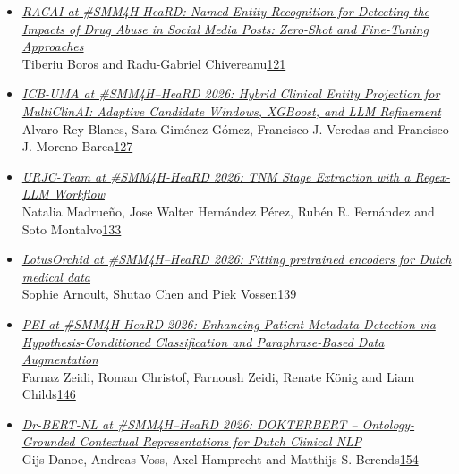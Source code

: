 \documentclass[11pt,oneside]{book}
\begin{document}
\begin{itemize}[leftmargin=*,label={}]
       \item \hyperlink{page.121}{\emph{RACAI at \#SMM4H-HeaRD: Named Entity Recognition for Detecting the Impacts of Drug Abuse in Social Media Posts: Zero-Shot and Fine-Tuning Approaches}}\\ \hspace*{2em} Tiberiu Boros and Radu-Gabriel Chivereanu\dotfill \hyperlink{page.121}{121}
       \item \hyperlink{page.127}{\emph{ICB-UMA at \#SMM4H–HeaRD 2026: Hybrid Clinical Entity Projection for MultiClinAI: Adaptive Candidate Windows, XGBoost, and LLM Refinement}}\\ \hspace*{2em} Alvaro Rey-Blanes, Sara Giménez-Gómez, Francisco J. Veredas and Francisco J. Moreno-Barea\dotfill \hyperlink{page.127}{127}
       \item \hyperlink{page.133}{\emph{URJC-Team at \#SMM4H-HeaRD 2026: TNM Stage Extraction with a Regex-LLM Workflow}}\\ \hspace*{2em} Natalia Madrueño, Jose Walter Hernández Pérez, Rubén R. Fernández and Soto Montalvo\dotfill \hyperlink{page.133}{133}
       \item \hyperlink{page.139}{\emph{LotusOrchid at \#SMM4H–HeaRD 2026: Fitting pretrained encoders for Dutch medical data}}\\ \hspace*{2em} Sophie Arnoult, Shutao Chen and Piek Vossen\dotfill \hyperlink{page.139}{139}
       \item \hyperlink{page.146}{\emph{PEI at \#SMM4H-HeaRD 2026: Enhancing Patient Metadata Detection via Hypothesis-Conditioned Classification and Paraphrase-Based Data Augmentation}}\\ \hspace*{2em} Farnaz Zeidi, Roman Christof, Farnoush Zeidi, Renate König and Liam Childs\dotfill \hyperlink{page.146}{146}
       \item \hyperlink{page.154}{\emph{Dr-BERT-NL at \#SMM4H–HeaRD 2026: DOKTERBERT – Ontology-Grounded Contextual Representations for Dutch Clinical NLP}}\\ \hspace*{2em} Gijs Danoe, Andreas Voss, Axel Hamprecht and Matthijs S. Berends\dotfill \hyperlink{page.154}{154}

\end{itemize}
\end{document}
